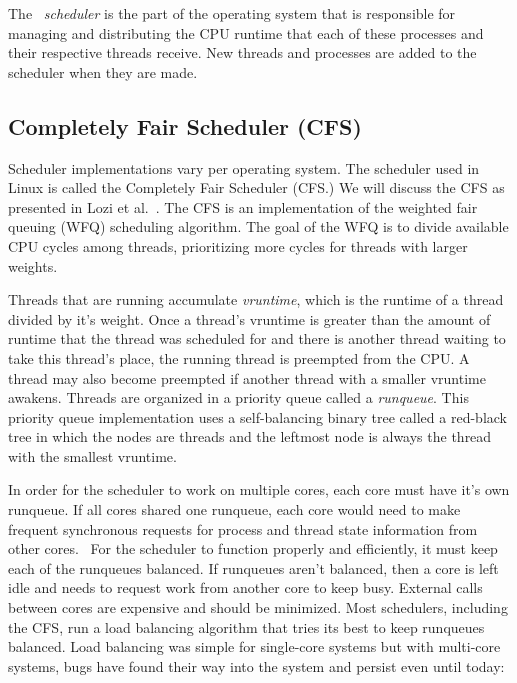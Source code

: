 \documentclass{sig-alternate}
\begin{document}
The ~\emph{scheduler} is the part of the operating system that is responsible for managing and distributing the CPU runtime that each of these processes and their respective threads receive. New threads and processes are added to the scheduler when they are made.~\cite{Lozi:2016}

\subsection{Completely Fair Scheduler (CFS)}
\label{sec:cfs}

Scheduler implementations vary per operating system. The scheduler used in Linux is called the Completely Fair Scheduler (CFS.) We will discuss the CFS as presented in Lozi et al.~\cite{Lozi:2016}. The CFS is an implementation of the weighted fair queuing (WFQ) scheduling algorithm. The goal of the WFQ is to divide available CPU cycles among threads, prioritizing more cycles for threads with larger weights.

Threads that are running accumulate \emph{vruntime}, which is the runtime of a thread divided by it's weight. Once a thread's vruntime is greater than the amount of runtime that the thread was scheduled for and there is another thread waiting to take this thread's place, the running thread is preempted from the CPU. A thread may also become preempted if another thread with a smaller vruntime awakens. Threads are organized in a priority queue called a \emph{runqueue}. This priority queue implementation uses a self-balancing binary tree called a red-black tree in which the nodes are threads and the leftmost node is always the thread with the smallest vruntime.~\cite{Lozi:2016}

In order for the scheduler to work on multiple cores, each core must have it's own runqueue. If all cores shared one runqueue, each core would need to make frequent synchronous requests for process and thread state information from other cores.~\cite{Lozi:2016} For the scheduler to function properly and efficiently, it must keep each of the runqueues balanced. If runqueues aren't balanced, then a core is left idle and needs to request work from another core to keep busy. External calls between cores are expensive and should be minimized. Most schedulers, including the CFS, run a load balancing algorithm that tries its best to keep runqueues balanced. Load balancing was simple for single-core systems but with multi-core systems, bugs have found their way into the system and persist even until today:
\end{document}
